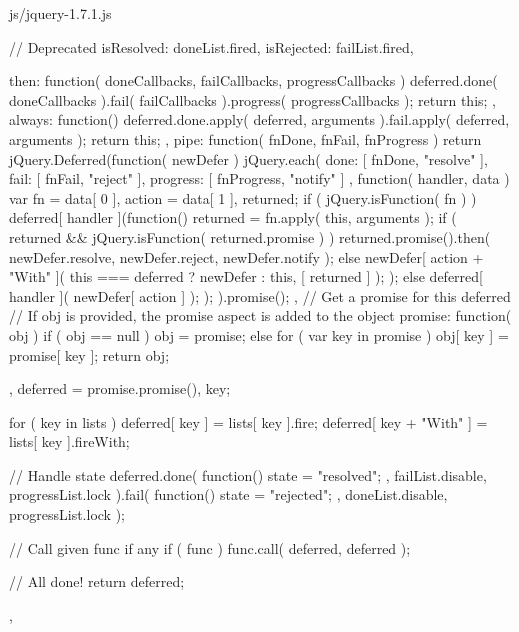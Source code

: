 \documentclass{article}
\begin{document}
\begin{chunk}{js/jquery-1.7.1.js}
{{{{				// Deprecated
				isResolved: doneList.fired,
				isRejected: failList.fired,

				then: function( doneCallbacks, failCallbacks, progressCallbacks ) {
					deferred.done( doneCallbacks ).fail( failCallbacks ).progress( progressCallbacks );
					return this;
				},
				always: function() {
					deferred.done.apply( deferred, arguments ).fail.apply( deferred, arguments );
					return this;
				},
				pipe: function( fnDone, fnFail, fnProgress ) {
					return jQuery.Deferred(function( newDefer ) {
						jQuery.each( {
							done: [ fnDone, "resolve" ],
							fail: [ fnFail, "reject" ],
							progress: [ fnProgress, "notify" ]
						}, function( handler, data ) {
							var fn = data[ 0 ],
								action = data[ 1 ],
								returned;
							if ( jQuery.isFunction( fn ) ) {
								deferred[ handler ](function() {
									returned = fn.apply( this, arguments );
									if ( returned && jQuery.isFunction( returned.promise ) ) {
										returned.promise().then( newDefer.resolve, newDefer.reject, newDefer.notify );
									} else {
										newDefer[ action + "With" ]( this === deferred ? newDefer : this, [ returned ] );
									}
								});
							} else {
								deferred[ handler ]( newDefer[ action ] );
							}
						});
					}).promise();
				},
				// Get a promise for this deferred
				// If obj is provided, the promise aspect is added to the object
				promise: function( obj ) {
					if ( obj == null ) {
						obj = promise;
					} else {
						for ( var key in promise ) {
							obj[ key ] = promise[ key ];
						}
					}
					return obj;
				}
			},
			deferred = promise.promise({}),
			key;

		for ( key in lists ) {
			deferred[ key ] = lists[ key ].fire;
			deferred[ key + "With" ] = lists[ key ].fireWith;
		}

		// Handle state
		deferred.done( function() {
			state = "resolved";
		}, failList.disable, progressList.lock ).fail( function() {
			state = "rejected";
		}, doneList.disable, progressList.lock );

		// Call given func if any
		if ( func ) {
			func.call( deferred, deferred );
		}

		// All done!
		return deferred;
	},

}}
\end{chunk}
\end{document}
